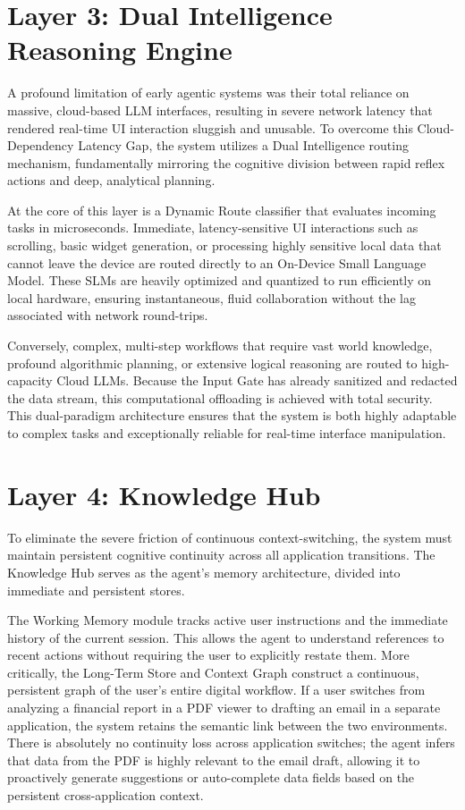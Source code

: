 \documentclass[12pt, a4paper]{report}
\begin{document}
\section{Layer 3: Dual Intelligence Reasoning Engine}
A profound limitation of early agentic systems was their total reliance on massive, cloud-based LLM interfaces, resulting in severe network latency that rendered real-time UI interaction sluggish and unusable.\cite{hojo2025} To overcome this Cloud-Dependency Latency Gap, the system utilizes a Dual Intelligence routing mechanism, fundamentally mirroring the cognitive division between rapid reflex actions and deep, analytical planning.\cite{hojo2025}

At the core of this layer is a Dynamic Route classifier that evaluates incoming tasks in microseconds. Immediate, latency-sensitive UI interactions such as scrolling, basic widget generation, or processing highly sensitive local data that cannot leave the device are routed directly to an On-Device Small Language Model.\cite{hojo2025} These SLMs are heavily optimized and quantized to run efficiently on local hardware, ensuring instantaneous, fluid collaboration without the lag associated with network round-trips.

Conversely, complex, multi-step workflows that require vast world knowledge, profound algorithmic planning, or extensive logical reasoning are routed to high-capacity Cloud LLMs.\cite{hojo2025} Because the Input Gate has already sanitized and redacted the data stream, this computational offloading is achieved with total security. This dual-paradigm architecture ensures that the system is both highly adaptable to complex tasks and exceptionally reliable for real-time interface manipulation.

\section{Layer 4: Knowledge Hub}
To eliminate the severe friction of continuous context-switching, the system must maintain persistent cognitive continuity across all application transitions.\cite{hojo2025} The Knowledge Hub serves as the agent's memory architecture, divided into immediate and persistent stores.

The Working Memory module tracks active user instructions and the immediate history of the current session.\cite{hojo2025} This allows the agent to understand references to recent actions without requiring the user to explicitly restate them. More critically, the Long-Term Store and Context Graph construct a continuous, persistent graph of the user's entire digital workflow.\cite{hojo2025} If a user switches from analyzing a financial report in a PDF viewer to drafting an email in a separate application, the system retains the semantic link between the two environments. There is absolutely no continuity loss across application switches; the agent infers that data from the PDF is highly relevant to the email draft, allowing it to proactively generate suggestions or auto-complete data fields based on the persistent cross-application context.\cite{hojo2025}
\end{document}
